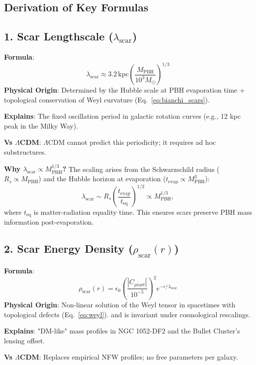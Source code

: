 \documentclass{article}
\begin{document}
\begin{appendix}
\section{Derivation of Key Formulas} 
\label{app:formulas}

\subsection*{1. Scar Lengthscale ($\lambda_{\text{scar}}$)}
\textbf{Formula}:  
\[
\lambda_{\text{scar}} \approx 3.2\,\text{kpc} \left(\frac{M_{\text{PBH}}}{10^3 M_\odot}\right)^{1/3}
\]  
\textbf{Physical Origin}:  
Determined by the Hubble scale at PBH evaporation time + topological conservation of Weyl curvature (Eq.~\ref{eq:bianchi_scars}).\\ \par  
\textbf{Explains}:  
The fixed oscillation period in galactic rotation curves (e.g., 12 kpc peak in the Milky Way). \\ \par  
\textbf{Vs $\Lambda$CDM}:  
$\Lambda$CDM cannot predict this periodicity; it requires ad hoc substructures. \\ \par 

\noindent \textbf{Why $\lambda_{\text{scar}} \propto M_{\text{PBH}}^{1/3}$?}  
The scaling arises from the Schwarzschild radius ($R_s \propto M_{\text{PBH}}$) and the Hubble horizon at evaporation ($t_{\text{evap}} \propto M_{\text{PBH}}^3$):  
\begin{equation}  
\lambda_{\text{scar}} \sim R_s \left(\frac{t_{\text{evap}}}{t_{\text{eq}}}\right)^{1/2} \propto M_{\text{PBH}}^{1/3},  
\end{equation}
where $t_{\text{eq}}$ is matter-radiation equality time. This ensures scars preserve PBH mass information post-evaporation.  

\subsection*{2. Scar Energy Density ($\rho_{\text{scar}}(r)$)}  
\textbf{Formula}:  
\[
\rho_{\text{scar}}(r) = \epsilon_0 \left(\frac{|C_{\mu\nu\rho\sigma}|}{10^{-5}}\right)^2 e^{-r/\lambda_{\text{scar}}}
\]  
\textbf{Physical Origin}:  
Non-linear solution of the Weyl tensor in spacetimes with topological defects (Eq.~\ref{eq:weyl}). and is invariant under cosmological rescalings. \\ \par
\textbf{Explains}:  
"DM-like" mass profiles in NGC 1052-DF2 and the Bullet Cluster's lensing offset. \\ \par  
\textbf{Vs $\Lambda$CDM}:  
Replaces empirical NFW profiles; no free parameters per galaxy.  


\end{appendix}
\end{document}
